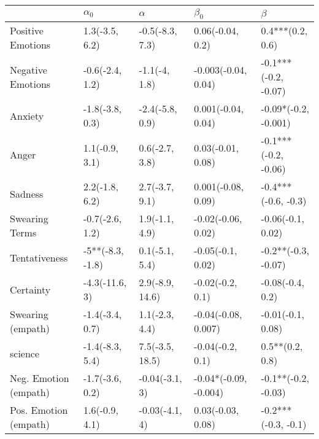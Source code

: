 \begin{tabular}{lllll}
\toprule
{} &        $\alpha_0$ &         $\alpha$ &              $\beta_0$ &               $\beta$ \\
\midrule
Positive Emotions     &    1.3(-3.5, 6.2) &  -0.5(-8.3, 7.3) &       0.06(-0.04, 0.2) &      0.4***(0.2, 0.6) \\
Negative Emotions     &   -0.6(-2.4, 1.2) &    -1.1(-4, 1.8) &    -0.003(-0.04, 0.04) &  -0.1***(-0.2, -0.07) \\
Anxiety               &   -1.8(-3.8, 0.3) &  -2.4(-5.8, 0.9) &     0.001(-0.04, 0.04) &  -0.09*(-0.2, -0.001) \\
Anger                 &    1.1(-0.9, 3.1) &   0.6(-2.7, 3.8) &      0.03(-0.01, 0.08) &  -0.1***(-0.2, -0.06) \\
Sadness               &    2.2(-1.8, 6.2) &   2.7(-3.7, 9.1) &     0.001(-0.08, 0.09) &   -0.4***(-0.6, -0.3) \\
Swearing Terms        &   -0.7(-2.6, 1.2) &   1.9(-1.1, 4.9) &     -0.02(-0.06, 0.02) &     -0.06(-0.1, 0.02) \\
Tentativeness         &  -5**(-8.3, -1.8) &   0.1(-5.1, 5.4) &      -0.05(-0.1, 0.02) &   -0.2**(-0.3, -0.07) \\
Certainty             &    -4.3(-11.6, 3) &  2.9(-8.9, 14.6) &       -0.02(-0.2, 0.1) &      -0.08(-0.4, 0.2) \\
Swearing (empath)     &   -1.4(-3.4, 0.7) &   1.1(-2.3, 4.4) &    -0.04(-0.08, 0.007) &     -0.01(-0.1, 0.08) \\
science               &   -1.4(-8.3, 5.4) &  7.5(-3.5, 18.5) &       -0.04(-0.2, 0.1) &       0.5**(0.2, 0.8) \\
Neg. Emotion (empath) &   -1.7(-3.6, 0.2) &   -0.04(-3.1, 3) &  -0.04*(-0.09, -0.004) &   -0.1**(-0.2, -0.03) \\
Pos. Emotion (empath) &    1.6(-0.9, 4.1) &   -0.03(-4.1, 4) &      0.03(-0.03, 0.08) &   -0.2***(-0.3, -0.1) \\
\bottomrule
\end{tabular}
